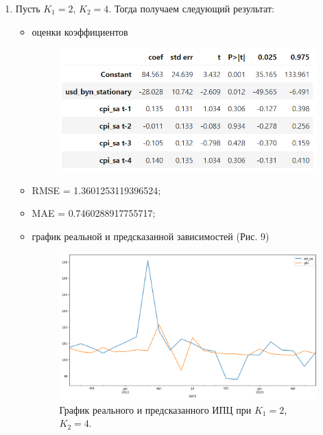 \documentclass[a4paper, 12pt]{extarticle}
\begin{document}
\begin{enumerate}
\begin{itemize}
			\end{itemize}
			
			\item Пусть $K_1 = 2$, $K_2 = 4$. Тогда получаем следующий результат:
			\begin{itemize}
				\item оценки коэффициентов \begin{figure}[h!]
					\centering
					\includegraphics[scale=1.1]{images/tab_5}
					\label{fig:tab5}
				\end{figure}
				
				\item RMSE = 1.3601253119396524;
				\item MAE = 0.7460288917755717;
				\item график реальной и предсказанной зависимостей (Рис. 9)
				\begin{figure}[h!]
					\centering
					\includegraphics[scale=0.4]{images/pic_09}
					\caption[Рис. 9]{График реального и предсказанного ИПЦ при $K_1 = 2$, $K_2 =4$.}
					\label{fig:pic09}
				\end{figure}
				
			\end{itemize}
			

\end{enumerate}
\end{document}
